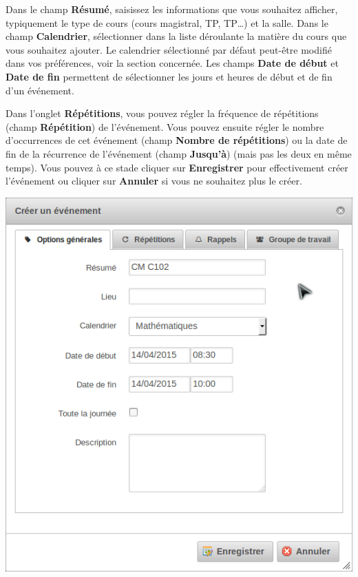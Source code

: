 \documentclass[a4paper, 11pt]{report}
\begin{document}
			Dans le champ \textbf{Résumé}, saisissez les informations que vous souhaitez afficher, typiquement le type de cours (cours magistral, TP, TP…) et la salle. Dans le champ \textbf{Calendrier}, sélectionner dans la liste déroulante la matière du cours que vous souhaitez ajouter. Le calendrier sélectionné par défaut peut-être modifié dans vos préférences, voir la section concernée. Les champs \textbf{Date de début} et \textbf{Date de fin} permettent de sélectionner les jours et heures de début et de fin d’un événement.

			Dans l’onglet \textbf{Répétitions}, vous pouvez régler la fréquence de répétitions (champ \textbf{Répétition}) de l’événement. Vous pouvez ensuite régler le nombre d’occurrences de cet événement (champ \textbf{Nombre de répétitions}) ou la date de fin de la récurrence de l’événement (champ \textbf{Jusqu’à}) (mais pas les deux en même temps). Vous pouvez à ce stade cliquer sur \textbf{Enregistrer} pour effectivement créer l’événement ou cliquer sur \textbf{Annuler} si vous ne souhaitez plus le créer.

			\begin{center}
				\includegraphics[scale = 0.7]{creer_evenement.png}
			\end{center}
\end{document}
